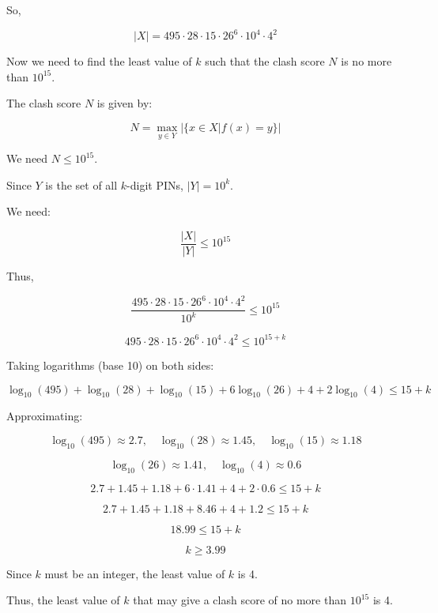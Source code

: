 \documentclass{article}
\begin{document}
	So,
	
	\[
	|X| = 495 \cdot 28 \cdot 15 \cdot 26^6 \cdot 10^4 \cdot 4^2
	\]
	
	Now we need to find the least value of \( k \) such that the clash score \( N \) is no more than \( 10^{15} \).
	
	The clash score \( N \) is given by:
	
	\[
	N = \max_{y \in Y} | \{ x \in X | f(x) = y \} |
	\]
	
	We need \( N \leq 10^{15} \).
	
	Since \( Y \) is the set of all \( k \)-digit PINs, \( |Y| = 10^k \).
	
	We need:
	
	\[
	\frac{|X|}{|Y|} \leq 10^{15}
	\]
	
	Thus,
	
	\[
	\frac{495 \cdot 28 \cdot 15 \cdot 26^6 \cdot 10^4 \cdot 4^2}{10^k} \leq 10^{15}
	\]
	
	\[
	495 \cdot 28 \cdot 15 \cdot 26^6 \cdot 10^4 \cdot 4^2 \leq 10^{15+k}
	\]
	
	Taking logarithms (base 10) on both sides:
	
	\[
	\log_{10}(495) + \log_{10}(28) + \log_{10}(15) + 6 \log_{10}(26) + 4 + 2 \log_{10}(4) \leq 15 + k
	\]
	
	Approximating:
	
	\[
	\log_{10}(495) \approx 2.7, \quad \log_{10}(28) \approx 1.45, \quad \log_{10}(15) \approx 1.18
	\]
	
	\[
	\log_{10}(26) \approx 1.41, \quad \log_{10}(4) \approx 0.6
	\]
	
	\[
	2.7 + 1.45 + 1.18 + 6 \cdot 1.41 + 4 + 2 \cdot 0.6 \leq 15 + k
	\]
	
	\[
	2.7 + 1.45 + 1.18 + 8.46 + 4 + 1.2 \leq 15 + k
	\]
	
	\[
	18.99 \leq 15 + k
	\]
	
	\[
	k \geq 3.99
	\]
	
	Since \( k \) must be an integer, the least value of \( k \) is 4.
	
	Thus, the least value of \( k \) that may give a clash score of no more than \( 10^{15} \) is 4.
	
	
	
	


	
\end{document}
